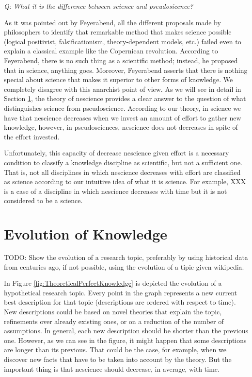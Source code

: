 \vskip 0.5cm


\emph{Q: What it is the difference between science and pseudosicence?}

As it was pointed out by Feyerabend, all the different proposals made by philosophers to identify that remarkable method that makes science possible (logical positivist, falsificationism, theory-dependent models, etc.) failed even to explain a classical example like the Copernican revolution. According to Feyerabend, there is no such thing as a scientific method; instead, he proposed that in science, anything goes. Moreover, Feyerabend asserts that there is nothing special about science that makes it superior to other forms of knowledge. We completely disagree with this anarchist point of view. As we will see in detail in Section \ref{sec:evolution-knowlege}, the theory of nescience provides a clear answer to the question of what distinguishes science from pseudoscience. According to our theory, in science we have that nescience decreases when we invest an amount of effort to gather new knowledge, however, in pseudosciences, nescience does not decreases in spite of the effort invested.

Unfortunately, this capacity of decrease nescience given effort is a necessary condition to classify a knowledge discipline as scientific, but not a sufficient one. That is, not all disciplines in which nescience decreases with effort are classified as science according to our intuitive idea of what it is science. For example, {\color{red} XXX} is a case of a discipline in which nescience decreases with time but it is not considered to be a science.

%
%

\section{Evolution of Knowledge}
\label{sec:evolution-knowlege}

{\color{red} TODO: Show the evolution of a research topic, preferably by using historical data from centuries ago, if not possible, using the evolution of a tipic given wikipedia.}

\begin{example}
In Figure \ref{fig:TheoreticalPerfectKnowledge} is depicted the evolution of a hypothetical research topic. Every point in the graph represents a new current best description for that topic (descriptions are ordered with respect to time). New descriptions could be based on novel theories that explain the topic, refinements over already existing ones, or on a reduction of the number of assumptions. In general, each new description should be shorter than the previous one. However, as we can see in the figure, it might happen that some descriptions are longer than its previous. That could be the case, for example, when we discover new facts that have to be taken into account by the theory. But the important thing is that nescience should decrease, in average, with time.
\end{example}

